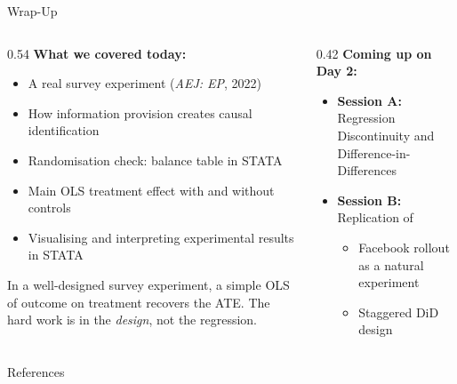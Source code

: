 \documentclass[aspectratio=169, 11pt]{beamer}
\begin{document}
\begin{frame}[t]{Wrap-Up}
\begin{columns}[T]
\begin{column}{0.54\textwidth}
\textbf{What we covered today:}
\begin{itemize}
  \setlength\itemsep{0.4em}
  \item A real survey experiment (\textit{AEJ: EP}, 2022)
  \item How information provision creates causal identification
  \item Randomisation check: balance table in STATA
  \item Main OLS treatment effect with and without controls
  \item Visualising and interpreting experimental results in STATA
\end{itemize}
\vspace{0.4em}
\begin{keybox}
In a well-designed survey experiment, a simple OLS of outcome on treatment recovers the ATE.
The hard work is in the \emph{design}, not the regression.
\end{keybox}
\end{column}
\begin{column}{0.42\textwidth}
\textbf{Coming up on Day 2:}
\begin{itemize}
  \setlength\itemsep{0.4em}
  \item \textbf{Session A:} Regression Discontinuity and Difference-in-Differences
  \item \textbf{Session B:} Replication of \citet{Braghieri2022_socialmedia}
  \begin{itemize}
    \item Facebook rollout as a natural experiment
    \item Staggered DiD design
  \end{itemize}
\end{itemize}
\vspace{0.5em}
\end{column}
\end{columns}
\end{frame}


\begin{frame}[allowframebreaks]{References}
  
\end{frame}
\end{document}
